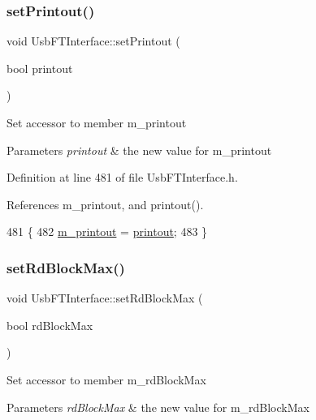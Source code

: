 \subsubsection{\texorpdfstring{set\+Printout()}{setPrintout()}}
{\footnotesize\ttfamily void Usb\+F\+T\+Interface\+::set\+Printout (\begin{DoxyParamCaption}\item[{bool}]{printout }\end{DoxyParamCaption})\hspace{0.3cm}{\ttfamily [inline]}}

Set accessor to member m\+\_\+printout 
\begin{DoxyParams}{Parameters}
{\em printout} & the new value for m\+\_\+printout \\
\hline
\end{DoxyParams}


Definition at line 481 of file Usb\+F\+T\+Interface.\+h.



References m\+\_\+printout, and printout().


\begin{DoxyCode}
481                                    \{
482     \hyperlink{classUsbFTInterface_aa4d5f5ffb4d3b26f1effdf84087aea91}{m\_printout} = \hyperlink{classUsbFTInterface_ad312ac511dfb57c513f2998de396ba9b}{printout};
483   \}
\end{DoxyCode}
\mbox{\label{classUsbFTInterface_a63615ac245f36dc6a298228d8dcd31c4}} 
\subsubsection{\texorpdfstring{set\+Rd\+Block\+Max()}{setRdBlockMax()}}
{\footnotesize\ttfamily void Usb\+F\+T\+Interface\+::set\+Rd\+Block\+Max (\begin{DoxyParamCaption}\item[{bool}]{rd\+Block\+Max }\end{DoxyParamCaption})\hspace{0.3cm}{\ttfamily [inline]}}

Set accessor to member m\+\_\+rd\+Block\+Max 
\begin{DoxyParams}{Parameters}
{\em rd\+Block\+Max} & the new value for m\+\_\+rd\+Block\+Max \\
\hline
\end{DoxyParams}


